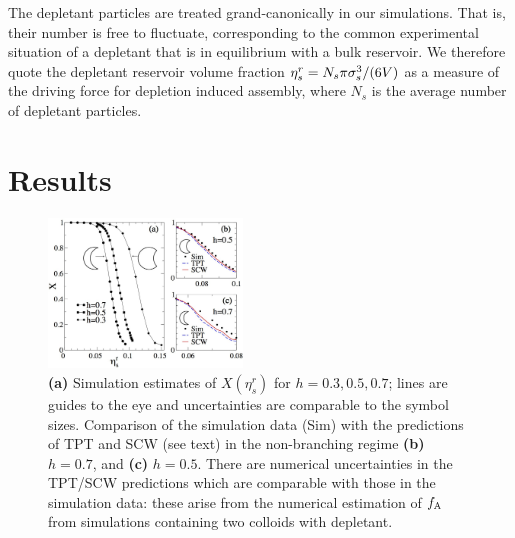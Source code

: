 \documentclass[8.5pt,oneside,onecolumn]{article}
\newcommand{\figurewidth}{0.46\textwidth}
\begin{document}
The depletant particles are treated grand-canonically in our simulations.
That is, their number is free to fluctuate, corresponding to the
common experimental situation of a depletant that is in equilibrium
with a bulk reservoir.  We therefore quote the depletant reservoir
volume fraction $\eta_s^r=N_s\pi\sigma_s^3/(6V)$ as a measure of the
driving force for depletion induced assembly, where $N_s$ is the
average number of depletant particles.


\section{Results} \label{sec:results}

\begin{figure} 
  \includegraphics[width=\figurewidth]{Fig3.jpg}
\caption{{\bf (a)} Simulation estimates of $X(\eta_s^r)$ for
 $h=0.3,0.5,0.7$; lines are guides to the eye and uncertainties are
 comparable to the symbol sizes. Comparison of the simulation data (Sim)
 with the predictions of TPT and SCW (see text) in the non-branching regime {\bf (b)} $h=0.7$, and {\bf (c)} $h=0.5$.
 There are numerical uncertainties in the TPT/SCW predictions which are comparable with those in
 the simulation data: these arise from the numerical estimation
 of $f_{\rm A}$ from simulations containing two colloids with depletant.}
  \label{fig:X}
\end{figure}
\end{document}
